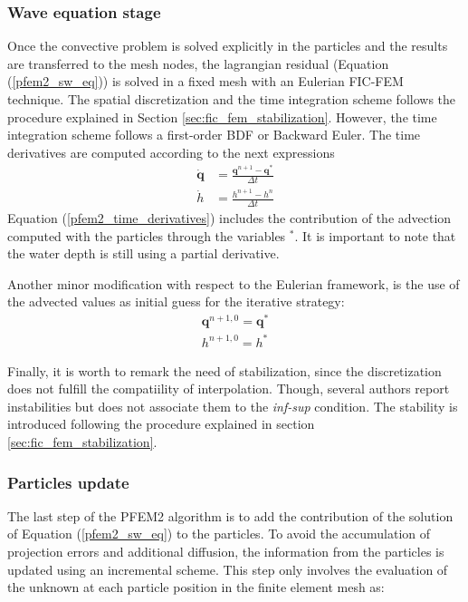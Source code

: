 \subsubsection{Wave equation stage}


Once the convective problem is solved explicitly in the particles and the results are transferred to the mesh nodes, the lagrangian residual (Equation (\ref{pfem2_sw_eq})) is solved in a fixed mesh with an Eulerian FIC-FEM technique. The spatial discretization and the time integration scheme follows the procedure explained in Section \ref{sec:fic_fem_stabilization}.
However, the time integration scheme follows a first-order BDF or Backward Euler.
The time derivatives are computed according to the next expressions
\begin{align} \label{pfem2_time_derivatives}
    \dot{\mathbf{q}} &= \frac{\mathbf{q}^{n+1} - \mathbf{q}^*}{\Delta t} \\
    \dot{h} &= \frac{h^{n+1} - h^n}{\Delta t}
\end{align}
Equation (\ref{pfem2_time_derivatives}) includes the contribution of the advection computed with the particles through the variables $^*$. It is important to note that the water depth is still using a partial derivative.

Another minor modification with respect to the Eulerian framework, is the use of the advected values as initial guess for the iterative strategy:
\begin{align}
    \mathbf{q}^{n+1,0} = \mathbf{q}^* \\
    h^{n+1,0} = h^*
\end{align}

Finally, it is worth to remark the need of stabilization, since the discretization does not fulfill the compatiility of interpolation. Though, several authors report instabilities but does not associate them to the \emph{inf-sup} condition. The stability is introduced following the procedure explained in section \ref{sec:fic_fem_stabilization}.


\subsubsection{Particles update}
The last step of the PFEM2 algorithm is to add the contribution of the solution of Equation (\ref{pfem2_sw_eq}) to the particles. To avoid the accumulation of projection errors and additional diffusion, the information from the particles is updated using an incremental scheme. This step only involves the evaluation of the unknown at each particle position in the finite element mesh as:

